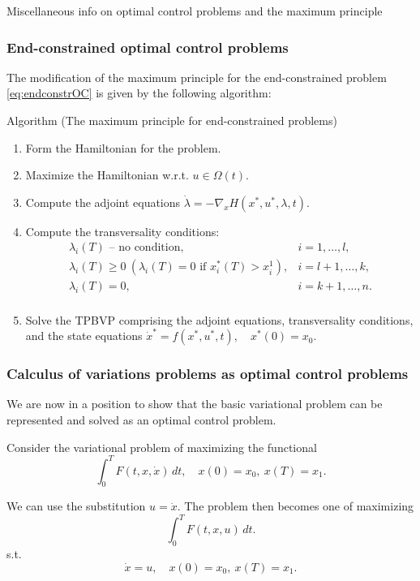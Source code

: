 \documentclass[10pt]{beamer}
\theoremstyle{definition}
\begin{document}
\begin{section}{Miscellaneous info on optimal control problems and the maximum principle}
\begin{frame}[fragile]
\frametitle{End-constrained optimal control problems}
The modification of the maximum principle for the end-constrained problem \eqref{eq:endconstrOC} is given by the following algorithm:

\begin{block}{Algorithm (The maximum principle for end-constrained problems)}
\begin{enumerate}
\item Form the Hamiltonian for the problem.
\item Maximize the Hamiltonian w.r.t. $ u \in \Omega(t) $.
\item Compute the adjoint equations $ \dot{\lambda} = -\nabla_x H(x^*,u^*,\lambda,t) $.
\item Compute the transversality conditions:
\begin{equation*}
\begin{array}{ll}
\lambda_i(T) \text{ -- no condition},& i=1,\ldots,l,\\
\lambda_i(T) \geq 0~\left(\lambda_i(T) = 0 \text{ if } x^*_i(T) > x^1_i\right),& i=l+1,\ldots,k,\\
\lambda_i(T)=0 ,& i=k+1,\ldots,n.\\
\end{array}
\end{equation*}
\item Solve the TPBVP comprising the adjoint equations, transversality conditions, and the state equations  $ \dot{x}^* = f(x^*,u^*,t), \quad x^*(0)=x_0 $. 
\end{enumerate}
\end{block}
\end{frame}

\begin{frame}[fragile]
\frametitle{Calculus of variations problems as optimal control problems}
We are now in a position to show that the basic variational problem can be represented and solved as an optimal control problem. \bigskip

Consider the variational problem of maximizing the functional \begin{equation*}
\int_{0}^{T} F(t,x,\dot{x})\,dt,\quad x(0)=x_0, ~x(T)=x_1.
\end{equation*}\bigskip

We can use the substitution $ u = \dot{x} $. The problem then becomes one of maximizing \begin{equation*}
\int_{0}^{T} F(t,x,u)\,dt.
\end{equation*}
s.t. \[ \dot{x}=u,\quad x(0)=x_0, ~x(T)=x_1. \]
\end{frame}


\end{section}
\end{document}
